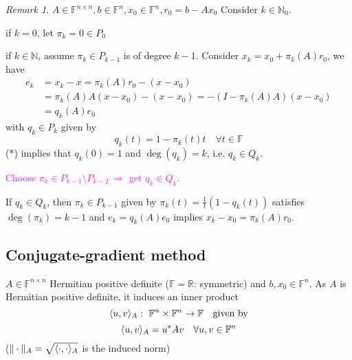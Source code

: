 \documentclass[12pt]{article}
\theoremstyle{definition}
\theoremstyle{remark}
\newtheorem{remark}[theorem]{Remark}
\numberwithin{equation}{section}
\newcommand{\F}{\mathbb{F}}
\newcommand{\R}{\mathbb{R}}
\newcommand{\N}{\mathbb{N}}
\newcommand{\normempty}{\|\cdot\|}
\DeclarePairedDelimiter{\iprod}{\langle}{\rangle}
\begin{document}
\begin{remark}
  \label{rem:7.3}
  $A \in \F^{n\times n}, b \in \F^n, x_0 \in \F^n, r_0 = b - Ax_0$ Consider $k \in \N_0$.

  if $k=0$, let $\pi_k = 0 \in P_0$

  if $k \in \N$, assume $\pi_k \in P_{k-1}$ is of degree $k-1$. Consider $x_k = x_0 + \pi_k(A) r_0$, we have
  \begin{align*}
    e_k &= x_k - x = \pi_k(A) r_0 - (x - x_0) \\
    &= \pi_k(A) A (x - x_0) - (x-x_0) = -(I-\pi_k(A) A)(x-x_0) \\
    &= q_k(A) e_0
  \end{align*}
  with $q_k \in P_k$ given by
  \begin{equation*}
    \tag{*}
    \boxed{q_k(t) = 1 - \pi_k(t)t} \quad \forall t \in \F
  \end{equation*}
  (*) implies that $q_k(0) = 1$ and $\deg(q_k) = k$, i.e. $q_k \in Q_k$.

  \textcolor{magenta}{
    Choose $\pi_k \in P_{k-1} \setminus P_{k-2}\ \Longrightarrow$ get $q_k \in Q_k$.
  }

  If $q_k \in Q_k$, then $\pi_k \in P_{k-1}$ given by $\pi_k(t) = \frac{1}{t}(1-q_k(t))$ satisfies $\deg(\pi_k) = k-1$ and $e_k = q_k(A)e_0$ implies $x_k - x_0 = \pi_k(A) r_0$.
\end{remark}
\subsection{Conjugate-gradient method}
$A \in \F^{n\times n}$ Hermitian positive definite ($\F = \R$: symmetric) and $b, x_0 \in \F^n$. As $A$ is Hermitian positive definite, it induces an inner product
\begin{equation*}
  \iprod{u,v}_A:\ \F^n \times \F^n \rightarrow \F \quad \text{given by}
\end{equation*}
\begin{equation*}
  \iprod{u,v}_A = u^* A v \quad \forall u, v \in \F^n
\end{equation*}
($\normempty_A= \sqrt{\iprod{\cdot,\cdot}_A}$ is the induced norm)
\end{document}
